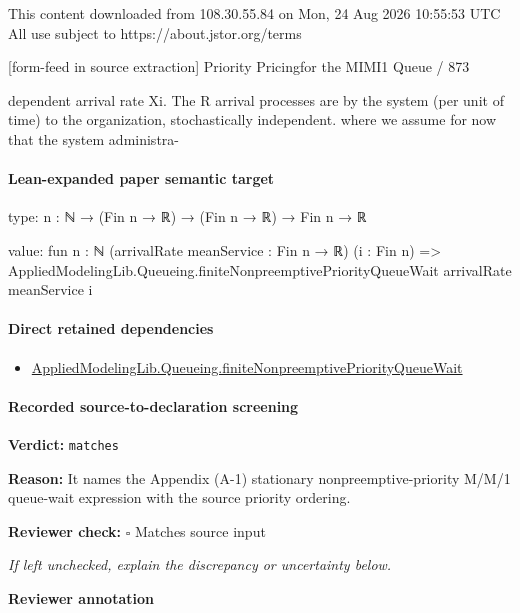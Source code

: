 \documentclass[10pt]{article}
\newcommand{\reviewerbox}{%
  \par\noindent\fbox{\parbox{0.96\linewidth}{\rule{0pt}{0.38in}}}\par
}
\newcommand{\reviewmatch}[1]{%
  \par\noindent\textbf{Reviewer check:} $\square$\; #1\par
  \noindent\emph{If left unchecked, explain the discrepancy or uncertainty below.}\par
}
\begin{document}
\begin{ReviewVerbatim}
                                                 This content downloaded from
                               108.30.55.84 on Mon, 24 Aug 2026 10:55:53 UTC
                                         All use subject to https://about.jstor.org/terms

[form-feed in source extraction]
                                                                                Priority Pricingfor the MIMI1 Queue / 873

dependent arrival rate Xi. The R arrival processes are                 by the system (per unit of time) to the organization,
stochastically independent.                                            where we assume for now that the system administra-
\end{ReviewVerbatim}



\paragraph{Lean-expanded paper semantic target}
\begin{ReviewVerbatim}
type:
{n : ℕ} → (Fin n → ℝ) → (Fin n → ℝ) → Fin n → ℝ

value:
fun {n : ℕ} (arrivalRate meanService : Fin n → ℝ) (i : Fin n) =>
  AppliedModelingLib.Queueing.finiteNonpreemptivePriorityQueueWait arrivalRate meanService i
\end{ReviewVerbatim}

\paragraph{Direct retained dependencies}
\begin{itemize}\raggedright
\item \hyperlink{library-prerequisite-795b7af1c661bc8d}{Applied\allowbreak{}Modeling\allowbreak{}Lib.\allowbreak{}Queueing.\allowbreak{}finite\allowbreak{}Nonpreemptive\allowbreak{}Priority\allowbreak{}Queue\allowbreak{}Wait}
\end{itemize}
\paragraph{Recorded source-to-declaration screening}
\textbf{Verdict:} \texttt{matches}
\\
{\raggedright
\textbf{Reason:} It names the Appendix (A-\allowbreak{}1) stationary nonpreemptive-\allowbreak{}priority M/\allowbreak{}M/\allowbreak{}1 queue-\allowbreak{}wait expression with the source priority ordering.\allowbreak{}
\par}
\reviewmatch{Matches source input}
\noindent\textbf{Reviewer annotation}\par
\reviewerbox
\clearpage
\hypertarget{paper-prerequisite-69133735a09302ef}{}
\end{document}
